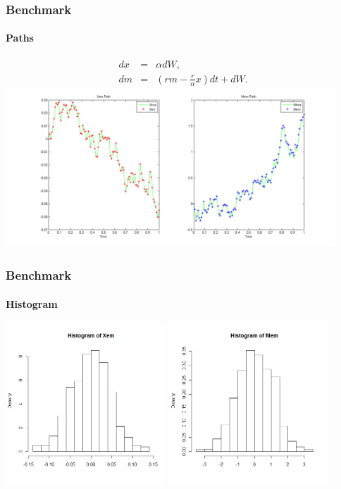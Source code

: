 \begin{frame}
    \frametitle{Benchmark}
	\framesubtitle{Paths}
\vspace*{-1cm}
\hspace*{-1cm}
\begin{eqnarray*}
	dx &=& \alpha dW, \\
	dm &=& \left( rm- \frac{r}{\alpha}x \right) dt + dW.
\end{eqnarray*}
\includegraphics[height=6cm]{testpaths} 
\end{frame}


\begin{frame}
    \frametitle{Benchmark}
	\framesubtitle{Histogram}
\hspace*{-5mm}
\includegraphics[height=6cm]{testhistX}
\includegraphics[height=6cm]{testhistM}
\end{frame}


